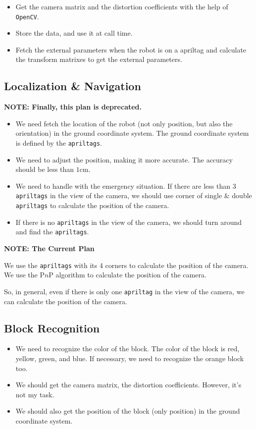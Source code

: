 \documentclass{article}
\begin{document}
\begin{itemize}
  \item Get the camera matrix and the distortion coefficients with the help of \texttt{OpenCV}.
  \item Store the data, and use it at call time.
  \item Fetch the external parameters when the robot is on a apriltag and calculate the transform matrixes to get the external parameters.
\end{itemize}

\subsection{Localization \& Navigation}

\textbf{NOTE: Finally, this plan is deprecated.}

\begin{itemize}
  \item We need fetch the location of the robot (not only position, but also the orientation) in the ground coordinate system. The ground coordinate system is defined by the \texttt{apriltags}.
  \item We need to adjust the position, making it more accurate. The accuracy should be less than $1\mathrm{cm}$.
  \item We need to handle with the emergency situation. If there are less than $3$ \texttt{apriltags} in the view of the camera, we should use corner of single \& double \texttt{apriltags} to calculate the position of the camera.
  \item If there is no \texttt{apriltags} in the view of the camera, we should turn around and find the \texttt{apriltags}.
\end{itemize}

\textbf{NOTE: The Current Plan}

We use the \texttt{apriltags} with its 4 corners to calculate the position of the camera. We use the P$n$P algorithm to calculate the position of the camera.

So, in general, even if there is only one \texttt{apriltag} in the view of the camera, we can calculate the position of the camera.

\subsection{Block Recognition}

\begin{itemize}
  \item We need to recognize the color of the block. The color of the block is red, yellow, green, and blue. If necessary, we need to recognize the orange block too.
  \item We should get the camera matrix, the distortion coefficients. However, it's not my task.
  \item We should also get the position of the block (only position) in the ground coordinate system.
\end{itemize}
\end{document}
